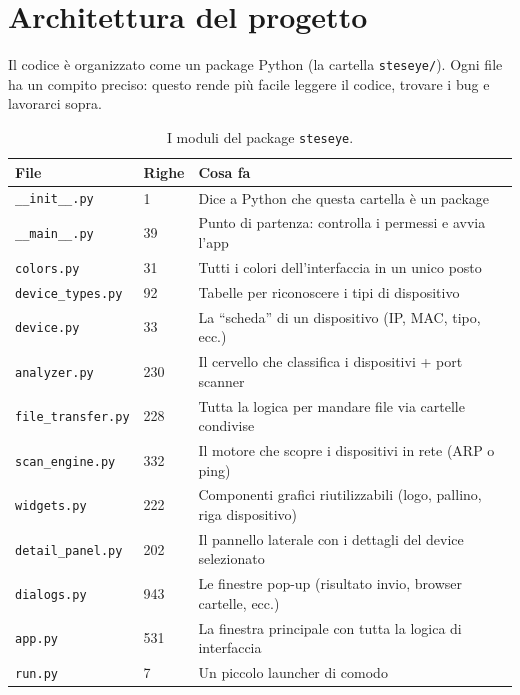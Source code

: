\documentclass[a4paper,11pt]{article}
\begin{document}
\section{Architettura del progetto}

Il codice è organizzato come un package Python (la cartella
\texttt{steseye/}).  Ogni file ha un compito preciso: questo
rende più facile leggere il codice, trovare i bug e lavorarci
sopra.

\begin{table}[H]
\centering
\small
\begin{tabularx}{\textwidth}{llX}
  \toprule
  \textbf{File} & \textbf{Righe} & \textbf{Cosa fa} \\
  \midrule
  \texttt{\_\_init\_\_.py}   &    1 & Dice a Python che questa cartella
                                      è un package \\
  \texttt{\_\_main\_\_.py}   &   39 & Punto di partenza: controlla i
                                      permessi e avvia l'app \\
  \texttt{colors.py}         &   31 & Tutti i colori dell'interfaccia
                                      in un unico posto \\
  \texttt{device\_types.py}  &   92 & Tabelle per riconoscere i tipi di
                                      dispositivo \\
  \texttt{device.py}         &   33 & La ``scheda'' di un dispositivo
                                      (IP, MAC, tipo, ecc.) \\
  \texttt{analyzer.py}       &  230 & Il cervello che classifica i
                                      dispositivi + port scanner \\
  \texttt{file\_transfer.py} &  228 & Tutta la logica per mandare file
                                      via cartelle condivise \\
  \texttt{scan\_engine.py}   &  332 & Il motore che scopre i dispositivi
                                      in rete (ARP o ping) \\
  \texttt{widgets.py}        &  222 & Componenti grafici riutilizzabili
                                      (logo, pallino, riga dispositivo) \\
  \texttt{detail\_panel.py}  &  202 & Il pannello laterale con i
                                      dettagli del device selezionato \\
  \texttt{dialogs.py}        &  943 & Le finestre pop-up (risultato
                                      invio, browser cartelle, ecc.) \\
  \texttt{app.py}            &  531 & La finestra principale con tutta
                                      la logica di interfaccia \\
  \texttt{run.py}            &    7 & Un piccolo launcher di comodo \\
  \bottomrule
\end{tabularx}
\caption{I moduli del package \texttt{steseye}.}
\end{table}
\end{document}
